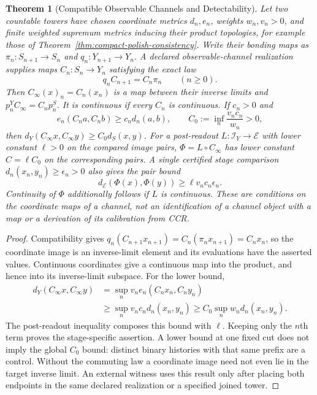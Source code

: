 \documentclass[11pt,a4paper]{article}
\theoremstyle{plain}
\newtheorem{theorem}{Theorem}[section]
\theoremstyle{definition}
\theoremstyle{remark}
\newcommand{\E}{\mathcal{E}}
\newcommand{\dE}{d_{\mathcal{E}}}
\begin{document}
\begin{theorem}[Compatible Observable Channels and Detectability]\label{thm:channel-projection-detectability}
Let two countable towers have chosen coordinate metrics $d_n,e_n$, weights
$w_n,v_n>0$, and finite weighted supremum metrics inducing their product
topologies, for example those of Theorem~\ref{thm:compact-polish-consistency}.
Write their bonding maps as $\pi_n:S_{n+1}\to S_n$ and
$q_n:Y_{n+1}\to Y_n$. A declared observable-channel realization supplies maps
$C_n:S_n\to Y_n$ satisfying the exact law
\[
 q_n C_{n+1}=C_n\pi_n\qquad(n\geq0).
\]
Then $C_\infty(x)_n=C_n(x_n)$ is a map between their inverse limits and
$p_n^Y C_\infty=C_np_n^S$. It is continuous if every $C_n$ is continuous.
If $c_n>0$ and
\[
 e_n(C_na,C_nb)\geq c_nd_n(a,b),\qquad
 C_0:=\inf_n\frac{v_nc_n}{w_n}>0,
\]
then $d_Y(C_\infty x,C_\infty y)\geq C_0d_S(x,y)$.
For a post-readout $L:\mathcal I_Y\to\E$ with lower constant $\ell>0$
on the compared image pairs, $\Phi=L\circ C_\infty$ has lower constant
$C=\ell C_0$ on the corresponding pairs. A single certified stage comparison
$d_n(x_n,y_n)\geq\epsilon_n>0$ also gives the pair bound
\[
 \dE(\Phi(x),\Phi(y))\geq\ell v_nc_n\epsilon_n.
\]
Continuity of $\Phi$ additionally follows if $L$ is continuous. These are
conditions on the coordinate maps of a channel, not an identification of a
channel object with a map or a derivation of its calibration from CCR.
\end{theorem}

\begin{proof}
Compatibility gives $q_n(C_{n+1}x_{n+1})=C_n(\pi_nx_{n+1})=C_nx_n$,
so the coordinate image is an inverse-limit element and its evaluations
have the asserted values. Continuous coordinates give a continuous map into
the product, and hence into its inverse-limit subspace. For the lower bound,
\[
\begin{aligned}
 d_Y(C_\infty x,C_\infty y)
 &=\sup_n v_ne_n(C_nx_n,C_ny_n)\\
 &\geq\sup_n v_nc_nd_n(x_n,y_n)
 \geq C_0\sup_n w_nd_n(x_n,y_n).
\end{aligned}
\]
The post-readout inequality composes this bound with $\ell$.
Keeping only the $n$th term proves the stage-specific assertion.
A lower bound at one fixed cut does not imply the global $C_0$ bound:
distinct binary histories with that same prefix are a control. Without the
commuting law a coordinate image need not even lie in the target inverse limit.
An external witness uses this result only after placing both endpoints in
the same declared realization or a specified joined tower.
\end{proof}
\end{document}
